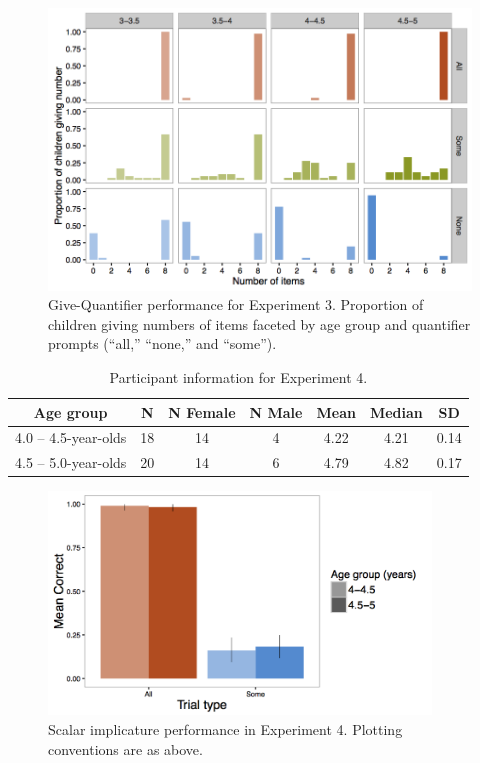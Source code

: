 \documentclass[man]{apa2}
\begin{document}
\begin{figure}
 \begin{center}
  \includegraphics[width=4.5in]{figures/exp3_GQhist.png}
  \caption{\label{fig:GQ_spread} Give-Quantifier performance for Experiment 3. Proportion of children giving numbers of items faceted by age group and quantifier prompts (``all,'' ``none,'' and ``some'').}
 \end{center}
\end{figure}

\begin{table}
\centering
\begin{tabular}{ccccccc}
\hline
{\bf Age group} & {\bf N} & {\bf N Female} & {\bf N Male} & {\bf Mean} & {\bf Median} & {\bf SD} \\
\hline
4.0 -- 4.5-year-olds & 18 & 14 & 4 & 4.22 & 4.21 & 0.14\\
4.5 -- 5.0-year-olds & 20 & 14 & 6 & 4.79 & 4.82 & 0.17\\
\hline
\end{tabular}
\caption{\label{tab:exp_4_demo} Participant information for Experiment 4.}
\end{table}

\begin{figure}
 \begin{center}
  \includegraphics[width=4in]{figures/exp4_SIperf.png}
  \caption{\label{fig:exp4_si} Scalar implicature performance in Experiment 4. Plotting conventions are as above.}
 \end{center}
\end{figure}


%
%
\end{document}
